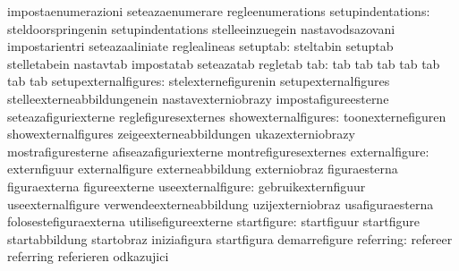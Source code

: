                                   impostaenumerazioni              seteazaenumerare
                                  regleenumerations
               setupindentations: steldoorspringenin               setupindentations
                                  stelleeinzuegein                 nastavodsazovani
                                  impostarientri                   seteazaaliniate
                                  reglealineas
                        setuptab: steltabin                        setuptab
                                  stelletabein                     nastavtab
                                  impostatab                       seteazatab
                                  regletab
                             tab: tab                              tab
                                  tab                              tab
                                  tab                              tab
                                  tab
            setupexternalfigures: stelexternefigurenin             setupexternalfigures
                                  stelleexterneabbildungenein      nastavexterniobrazy
                                  impostafigureesterne             seteazafiguriexterne
                                  reglefiguresexternes
             showexternalfigures: toonexternefiguren               showexternalfigures
                                  zeigeexterneabbildungen          ukazexterniobrazy
                                  mostrafiguresterne               afiseazafiguriexterne
                                  montrefiguresexternes
                  externalfigure: externfiguur                     externalfigure
                                  externeabbildung                 externiobraz
                                  figuraesterna                    figuraexterna
                                  figureexterne
               useexternalfigure: gebruikexternfiguur              useexternalfigure
                                  verwendeexterneabbildung         uzijexterniobraz
                                  usafiguraesterna                 folosestefiguraexterna
                                  utilisefigureexterne
                     startfigure: startfiguur                      startfigure
                                  startabbildung                   startobraz
                                  iniziafigura                     startfigura
                                  demarrefigure
                       referring: refereer                         referring
                                  referieren                       odkazujici
